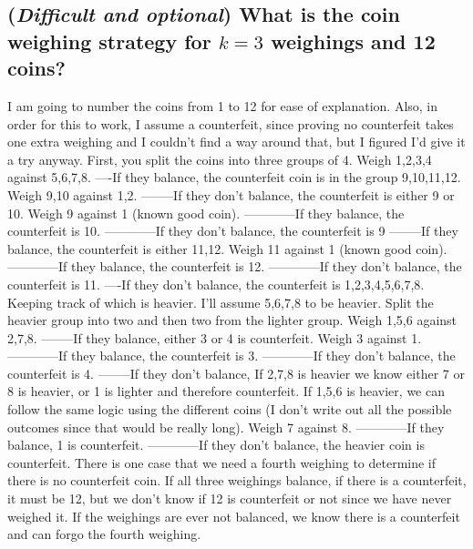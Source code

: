 \documentclass[11pt, oneside]{book}   	%
\begin{document}
\subsection{(\textit{Difficult and optional}) What is the coin weighing strategy for $k=3$ weighings and 12 coins?}
I am going to number the coins from 1 to 12 for ease of explanation.  Also, in order for this to work, I assume a counterfeit, since proving no counterfeit takes one extra weighing and I couldn't find a way around that, but I figured I'd give it a try anyway.\newline\newline
First, you split the coins into three groups of 4.  Weigh 1,2,3,4 against 5,6,7,8.\newline 
----If they balance, the counterfeit coin is in the group 9,10,11,12.  Weigh 9,10 against 1,2.\newline
--------If they don't balance, the counterfeit is either 9 or 10. Weigh 9 against 1 (known good coin).\newline
------------If they balance, the counterfeit is 10.\newline
------------If they don't balance, the counterfeit is 9\newline
--------If they balance, the counterfeit is either 11,12.  Weigh 11 against 1 (known good coin).\newline
------------If they balance, the counterfeit is 12.\newline
------------If they don't balance, the counterfeit is 11.\newline\newline
----If they don't balance, the counterfeit is 1,2,3,4,5,6,7,8.  Keeping track of which is heavier.  I'll assume 5,6,7,8 to be heavier.  Split the heavier group into two and then two from the lighter group.  Weigh 1,5,6 against 2,7,8.\newline
--------If they balance, either 3 or 4 is counterfeit.  Weigh 3 against 1.\newline
------------If they balance, the counterfeit is 3.\newline
------------If they don't balance, the counterfeit is 4.\newline
--------If they don't balance,  If 2,7,8 is heavier we know either 7 or 8 is heavier, or 1 is lighter and therefore counterfeit.  If 1,5,6 is heavier, we can follow the same logic using the different coins (I don't write out all the possible outcomes since that would be really long).  Weigh 7 against 8.\newline
------------If they balance, 1 is counterfeit.\newline
------------If they don't balance, the heavier coin is counterfeit.\newline\newline
There is one case that we need a fourth weighing to determine if there is no counterfeit coin.  If all three weighings balance, if there is a counterfeit, it must be 12, but we don't know if 12 is counterfeit or not since we have never weighed it.  If the weighings are ever not balanced, we know there is a counterfeit and can forgo the fourth weighing.
\end{document}
